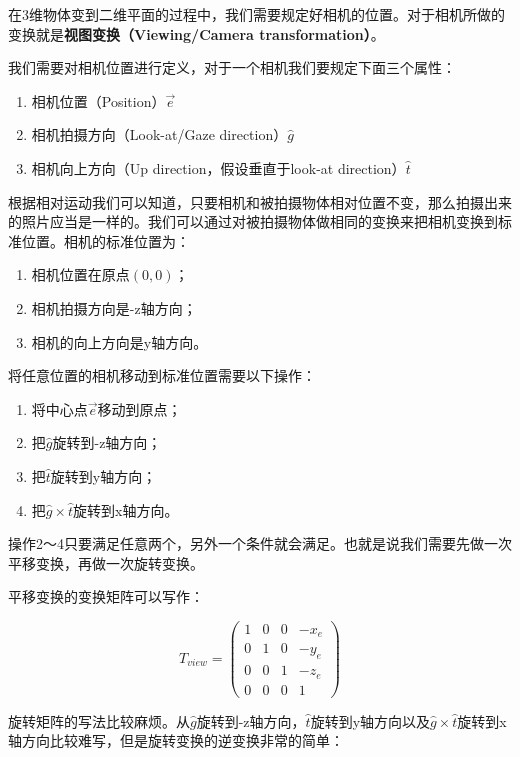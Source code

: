 \documentclass[openany]{progbookcn}
\begin{document}
在3维物体变到二维平面的过程中，我们需要规定好相机的位置。对于相机所做的变换就是\textbf{视图变换（Viewing/Camera transformation）}。

我们需要对相机位置进行定义，对于一个相机我们要规定下面三个属性：
\begin{enumerate}
	\item 相机位置（Position）$\overrightarrow{e}$
	\item 相机拍摄方向（Look-at/Gaze direction）$\hat{g}$
	\item 相机向上方向（Up direction，假设垂直于look-at direction）$\hat{t}$
\end{enumerate}

根据相对运动我们可以知道，只要相机和被拍摄物体相对位置不变，那么拍摄出来的照片应当是一样的。我们可以通过对被拍摄物体做相同的变换来把相机变换到标准位置。相机的标准位置为：
\begin{enumerate}
	\item 相机位置在原点$(0,0)$；
	\item 相机拍摄方向是-z轴方向；
	\item 相机的向上方向是y轴方向。
\end{enumerate}

将任意位置的相机移动到标准位置需要以下操作：

\begin{enumerate}
	\item 将中心点$\overrightarrow{e}$移动到原点；
	\item 把$\hat{g}$旋转到-z轴方向；
	\item 把$\hat{t}$旋转到y轴方向；
	\item 把$\hat{g}\times\hat{t}$旋转到x轴方向。
\end{enumerate}

操作2～4只要满足任意两个，另外一个条件就会满足。也就是说我们需要先做一次平移变换，再做一次旋转变换。

平移变换的变换矩阵可以写作：

\begin{equation}
	T_{view}=\begin{pmatrix}1&0&0&-x_e\\0&1&0&-y_e\\0&0&1&-z_e\\0&0&0&1\end{pmatrix}
\end{equation}

旋转矩阵的写法比较麻烦。从$\hat{g}$旋转到-z轴方向，$\hat{t}$旋转到y轴方向以及$\hat{g}\times\hat{t}$旋转到x轴方向比较难写，但是旋转变换的逆变换非常的简单：
\end{document}
